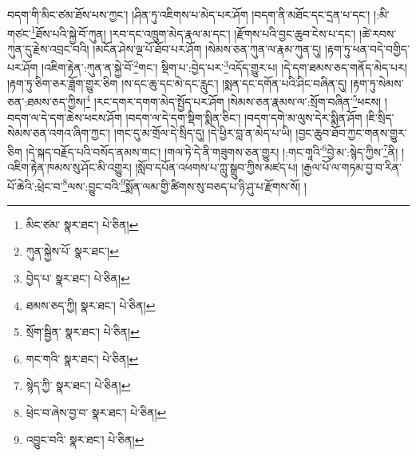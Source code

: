 བདག་གི་མིང་ཙམ་ཐོས་པས་ཀྱང་། །ཤིན་ཏུ་འཇིགས་པ་མེད་པར་ཤོག །བདག་ནི་མཐོང་དང་དྲན་པ་དང་། །:མི་གཙང་\footnote{མིང་ཙམ་  སྣར་ཐང་།  པེ་ཅིན། }ཐོས་པའི་སྐྱེ་བོ་ཀུན། །རབ་དང་འཁྲུག་མེད་རྣལ་མ་དང་། །རྫོགས་པའི་བྱང་ཆུབ་ངེས་པ་དང་། །ཚེ་རབས་ཀུན་དུ་རྗེས་འབྲང་བའི། །མངོན་ཤེས་ལྔ་པོ་ཐོབ་པར་ཤོག །སེམས་ཅན་ཀུན་ལ་རྣམ་ཀུན་དུ། །རྟག་ཏུ་ཕན་བདེ་བགྱིད་པར་ཤོག །འཇིག་རྟེན་:ཀུན་ན་སྐྱེ་བོ་\footnote{ཀུན་སྐྱེས་པོ་  སྣར་ཐང་། }གང་། སྡིག་པ་:བྱེད་པར་\footnote{བྱེད་པ་  སྣར་ཐང་།  པེ་ཅིན། }འདོད་གྱུར་པ། །དེ་དག་ཐམས་ཅད་གནོད་མེད་པར། །རྟག་ཏུ་ཅིག་ཅར་ཟློག་གྱུར་ཅིག །ས་དང་ཆུ་དང་མེ་དང་རླུང་། །སྨན་དང་དགོན་པའི་ཤིང་བཞིན་དུ། །རྟག་ཏུ་སེམས་ཅན་:ཐམས་ཅད་ཀྱིས།\footnote{ཐམས་ཅད་ཀྱི།  སྣར་ཐང་།  པེ་ཅིན། } །རང་དགར་དགག་མེད་སྤྱོད་པར་ཤོག །སེམས་ཅན་རྣམས་ལ་:སྲོག་བཞིན་\footnote{སྲོག་སྦྱིན་  སྣར་ཐང་།  པེ་ཅིན། }ཕངས། །བདག་ལ་དེ་དག་ཆེས་ཕངས་ཤོག །བདག་ལ་དེ་དག་སྡིག་སྨིན་ཅིང་། །བདག་དགེ་མ་ལུས་དེར་སྨིན་ཤོག །ཇི་སྲིད་སེམས་ཅན་འགའ་ཞིག་ཀྱང་། །གང་དུ་མ་གྲོལ་དེ་སྲིད་དུ། །དེ་ཕྱིར་བླ་ན་མེད་པ་ཡི། །བྱང་ཆུབ་ཐོབ་ཀྱང་གནས་གྱུར་ཅིག །དེ་སྐད་བརྗོད་པའི་བསོད་ནམས་གང་། །གལ་ཏེ་དེ་ནི་གཟུགས་ཅན་གྱུར། །:གང་གཱའི་\footnote{གང་གའི་  སྣར་ཐང་།  པེ་ཅིན། }བྱེ་མ་:སྙེད་ཀྱིས་\footnote{སྙེད་ཀྱི་  སྣར་ཐང་།  པེ་ཅིན། }ནི། །འཇིག་རྟེན་ཁམས་སུ་ཤོང་མི་འགྱུར། །སློབ་དཔོན་འཕགས་པ་ཀླུ་སྒྲུབ་ཀྱིས་མཛད་པ། །རྒྱལ་པོ་ལ་གཏམ་བྱ་བ་རིན་པོ་ཆེའི་:ཕྲེང་བ་\footnote{ཕྲེང་བ་ཞེས་བྱ་བ་  སྣར་ཐང་།  པེ་ཅིན། }ལས་:བྱུང་བའི་\footnote{འབྱུང་བའི་  སྣར་ཐང་།  པེ་ཅིན། }སྨོན་ལམ་གྱི་ཚིགས་སུ་བཅད་པ་ཉི་ཤུ་པ་རྫོགས་སོ། ། 